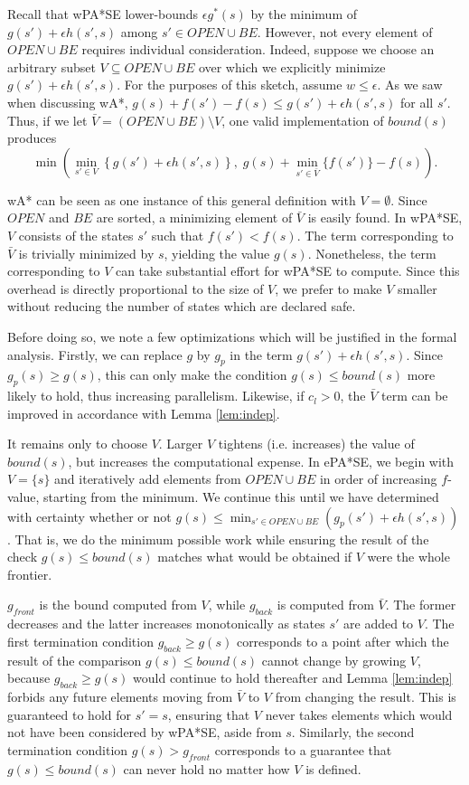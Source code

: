 \documentclass[letterpaper]{article}
\begin{document}
Recall that wPA*SE lower-bounds $\epsilon g^*(s)$ by the minimum of $g(s') + \epsilon h(s',s)$ among $s'\in OPEN\cup BE$. However, not every element of $OPEN\cup BE$ requires individual consideration. Indeed, suppose we choose an arbitrary subset $V\subseteq OPEN\cup BE$ over which we explicitly minimize $g(s') + \epsilon h(s',s)$. For the purposes of this sketch, assume $w\le\epsilon$. As we saw when discussing wA*, $g(s) + f(s') - f(s) \le g(s') + \epsilon h(s',s)$ for all $s'$. Thus, if we let $\bar V = (OPEN\cup BE)\setminus V$, one valid implementation of $bound(s)$ produces 
\[\min\left(\min_{s'\in V}\left\{g(s') + \epsilon h(s',s)\right\},\;g(s) + \min_{s'\in\bar V} \{f(s')\} - f(s)  \right).\]

wA* can be seen as one instance of this general definition with $V = \emptyset$. Since $OPEN$ and $BE$ are sorted, a minimizing element of $\bar V$ is easily found. In wPA*SE, $V$ consists of the states $s'$ such that $f(s') < f(s)$. The term corresponding to $\bar V$ is trivially minimized by $s$, yielding the value $g(s)$. Nonetheless, the term corresponding to $V$ can take substantial effort for wPA*SE to compute. Since this overhead is directly proportional to the size of $V$, we prefer to make $V$ smaller without reducing the number of states which are declared safe.

Before doing so, we note a few optimizations which will be justified in the formal analysis. Firstly, we can replace $g$ by $g_p$ in the term $g(s') + \epsilon h(s',s)$. Since $g_p(s) \ge g(s)$, this can only make the condition $g(s) \le bound(s)$ more likely to hold, thus increasing parallelism. Likewise, if $c_l > 0$, the $\bar V$ term can be improved in accordance with Lemma \ref{lem:indep}.

It remains only to choose $V$. Larger $V$ tightens (i.e. increases) the value of $bound(s)$, but increases the computational expense. In ePA*SE, we begin with $V = \{s\}$ and iteratively add elements from $OPEN\cup BE$ in order of increasing $f$-value, starting from the minimum. We continue this until we have determined with certainty whether or not $g(s) \le \min_{s'\in OPEN\cup BE}\left(g_p(s') + \epsilon h(s',s)\right)$. That is, we do the minimum possible work while ensuring the result of the check $g(s) \le bound(s)$ matches what would be obtained if $V$ were the whole frontier.

$g_{front}$ is the bound computed from $V$, while $g_{back}$ is computed from $\bar V$. The former decreases and the latter increases monotonically as states $s'$ are added to $V$. The first termination condition $g_{back} \ge g(s)$ corresponds to a point after which the result of the comparison $g(s) \le bound(s)$ cannot change by growing $V$, because $g_{back} \ge g(s)$ would continue to hold thereafter and Lemma \ref{lem:indep} forbids any future elements moving from $\bar V$ to $V$ from changing the result. This is guaranteed to hold for $s' = s$, ensuring that $V$ never takes elements which would not have been considered by wPA*SE, aside from $s$. Similarly, the second termination condition $g(s) > g_{front}$ corresponds to a guarantee that $g(s) \le bound(s)$ can never hold no matter how $V$ is defined.
\end{document}
